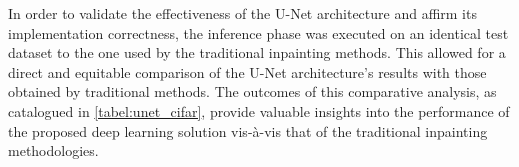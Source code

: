 In order to validate the effectiveness of the U-Net architecture and affirm its implementation correctness, the inference phase was executed on an identical test dataset to the one used by the traditional inpainting methods. This allowed for a direct and equitable comparison of the U-Net architecture's results with those obtained by traditional methods. The outcomes of this comparative analysis, as catalogued in \autoref{tabel:unet_cifar}, provide valuable insights into the performance of the proposed deep learning solution vis-à-vis that of the traditional inpainting methodologies.
\begin{table}[ht]
    \centering
\end{table}
